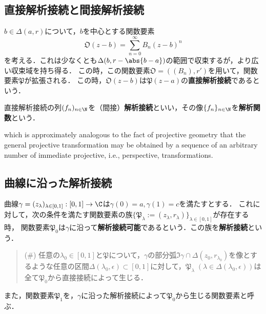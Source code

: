 \documentclass[uplatex, dvipdfmx]{jsreport}
\newcommand{\frakP}{\mathfrak{P}}
\begin{document}
\subsection{直接解析接続と間接解析接続}

\begin{definition}
    $b\in\Delta(a,r)$について，$b$を中心とする関数要素
    \[\mathfrak{O}(z-b)=\sum^\infty_{n=0}B_n(z-b)^n\]
    を考える．これは少なくとも$\Delta(b,r-\abs{b-a})$の範囲で収束するが，より広い収束域を持ち得る．
    この時，この関数要素$\mathfrak{O}=((B_n),r')$を用いて，関数要素$\mathfrak{P}$が拡張される．
    この時，$\mathfrak{O}(z-b)$は$\mathfrak{P}(z-a)$の\textbf{直接解析接続}であるという．
\end{definition}

\begin{definition}
    直接解析接続の列$(f_n)_{n\in\N}$を（間接）\textbf{解析接続}といい，その像$\{f_n\}_{n\in\N}$を\textbf{解析関数}という．
\end{definition}
\begin{remark}
    which is approximately analogous to the fact of projective geometry that the general projective transformation may be obtained by a sequence of an arbitrary number of immediate projective, i.e., perspective, transformations.
\end{remark}

\subsection{曲線に沿った解析接続}

\begin{definition}[曲線に沿った解析接続]
    曲線$\gamma=(z_\lambda)_{\lambda\in[0,1]}:[0,1]\to\C$は$\gamma(0)=a,\gamma(1)=c$を満たすとする．
    これに対して，次の条件を満たす関数要素の族$\{\mathfrak{P}_\lambda:=(z_\lambda,r_\lambda)\}_{\lambda\in[0,1]}$が存在する時，
    関数要素$\frakP_0$は$\gamma$に沿って\textbf{解析接続可能}であるという．この族を\textbf{解析接続}という．
    \begin{quote}
        (\#) 任意の$\lambda_0\in[0,1]$と$\frakP$について，$\gamma$の部分弧$\Im\gamma\cap\Delta(z_0,r_{\lambda_0})$を像とするような任意の区間$\Delta(\lambda_0,\epsilon)\subset[0,1]$に対して，$\frakP_\lambda\;(\lambda\in\Delta(\lambda_0,\epsilon))$は全て$\frakP_0$から直接接続によって生じる．
    \end{quote}
    また，関数要素$\frakP_1$を，$\gamma$に沿った解析接続によって$\frakP_0$から生じる関数要素と呼ぶ．
\end{definition}
\end{document}
